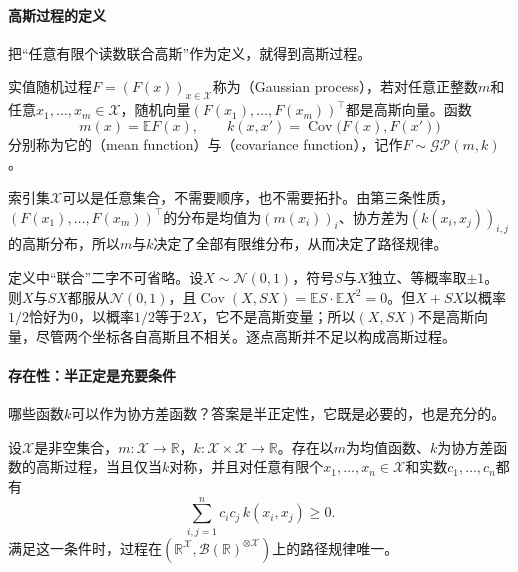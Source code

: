 \paragraph{高斯过程的定义}
把“任意有限个读数联合高斯”作为定义，就得到高斯过程。

\begin{definition}[高斯过程]
\label{def:spp-gaussian-process}
实值随机过程$F=(F(x))_{x\in\mathcal X}$称为（Gaussian process），若对任意正整数$m$和任意$x_1,\ldots,x_m\in\mathcal X$，随机向量$(F(x_1),\ldots,F(x_m))^\top$都是高斯向量。函数
\[
  m(x)=\mathbb EF(x),\qquad k(x,x')=\operatorname{Cov}\bigl(F(x),F(x')\bigr)
\]
分别称为它的（mean function）与（covariance function），记作$F\sim\mathcal{GP}(m,k)$。
\end{definition}

索引集$\mathcal X$可以是任意集合，不需要顺序，也不需要拓扑。由第三条性质，$(F(x_1),\ldots,F(x_m))^\top$的分布是均值为$(m(x_i))_i$、协方差为$(k(x_i,x_j))_{i,j}$的高斯分布，所以$m$与$k$决定了全部有限维分布，从而决定了路径规律。

定义中“联合”二字不可省略。设$X\sim\mathcal N(0,1)$，符号$S$与$X$独立、等概率取$\pm1$。则$X$与$SX$都服从$\mathcal N(0,1)$，且$\operatorname{Cov}(X,SX)=\mathbb ES\cdot\mathbb EX^2=0$。但$X+SX$以概率$1/2$恰好为$0$，以概率$1/2$等于$2X$，它不是高斯变量；所以$(X,SX)$不是高斯向量，尽管两个坐标各自高斯且不相关。逐点高斯并不足以构成高斯过程。

\paragraph{存在性：半正定是充要条件}
哪些函数$k$可以作为协方差函数？答案是半正定性，它既是必要的，也是充分的。

\begin{theorem}[高斯过程的存在与唯一]
\label{thm:spp-gp-existence}
设$\mathcal X$是非空集合，$m:\mathcal X\to\mathbb R$，$k:\mathcal X\times\mathcal X\to\mathbb R$。存在以$m$为均值函数、$k$为协方差函数的高斯过程，当且仅当$k$对称，并且对任意有限个$x_1,\ldots,x_n\in\mathcal X$和实数$c_1,\ldots,c_n$都有
\begin{equation}
  \sum_{i,j=1}^nc_ic_j\,k(x_i,x_j)\ge0 .
  \label{eq:spp-psd}
\end{equation}
满足这一条件时，过程在$(\mathbb R^{\mathcal X},\mathcal B(\mathbb R)^{\otimes\mathcal X})$上的路径规律唯一。
\end{theorem}

